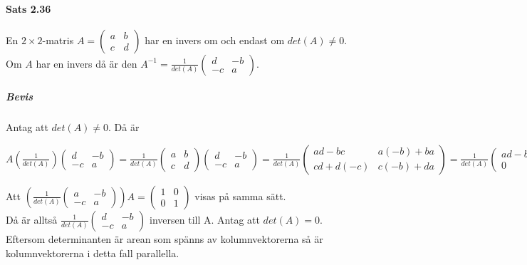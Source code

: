 \paragraph{Sats 2.36} En $2\times 2$-matris $A=\begin{pmatrix}a&b\\c&d\end{pmatrix}$ har en invers om och endast om $det(A)\neq 0$.
Om $A$ har en invers då är den $A^{-1}=\frac{1}{det(A)}\begin{pmatrix}d&-b\\-c&a\end{pmatrix}$.
\subparagraph{Bevis} Antag att $det(A)\neq 0$. Då är
\begin{center}
    $A(\frac{1}{det(A)})\begin{pmatrix}
        d&-b\\-c&a
    \end{pmatrix}=
    \frac{1}{det(A)}\begin{pmatrix}
        a&b\\c&d
    \end{pmatrix}\begin{pmatrix}
        d&-b\\-c&a
    \end{pmatrix}=
    \frac{1}{det(A)}\begin{pmatrix}
        ad-bc&a(-b)+ba\\cd+d(-c)&c(-b)+da
    \end{pmatrix}=
    \frac{1}{det(A)}\begin{pmatrix}
        ad-bc&0\\0&ad-bc
    \end{pmatrix}=
    \frac{1}{det(A)}\begin{pmatrix}
        det(A)&0\\0&det(A)
    \end{pmatrix}=\begin{pmatrix}
        1&0\\0&1
    \end{pmatrix}$
\end{center}
Att $(\frac{1}{det(A)}\begin{pmatrix}a&-b\\-c&a\end{pmatrix})A=\begin{pmatrix}1&0\\0&1\end{pmatrix}$ visas på samma sätt.\\
Då är alltså $\frac{1}{det(A)}\begin{pmatrix}d&-b\\-c&a\end{pmatrix}$ inversen till A.
Antag att $det(A)=0$.\\
Eftersom determinanten är arean som spänns av kolumnvektorerna så är kolumnvektorerna i detta fall parallella.

